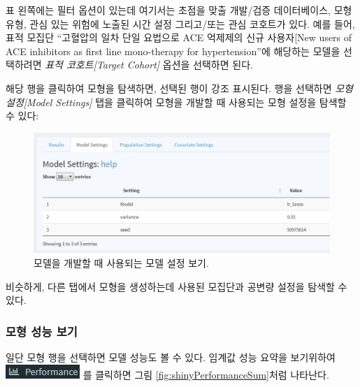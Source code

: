 \documentclass[11pt]{book}
\theoremstyle{definition}
\theoremstyle{definition}
\theoremstyle{definition}
\theoremstyle{remark}
\begin{document}
표 왼쪽에는 필터 옵션이 있는데 여기서는 초점을 맞출 개발/검증
데이터베이스, 모형 유형, 관심 있는 위험에 노출된 시간 설정 그리고/또는
관심 코호트가 있다. 예를 들어, 표적 모집단 ``고혈압의 일차 단일 요법으로
ACE 억제제의 신규 사용자{[}New users of ACE inhibitors as first line
mono-therapy for hypertension''에 해당하는 모델을 선택하려면 \emph{표적
코호트{[}Target Cohort{]}} 옵션을 선택하면 된다.

해당 행을 클릭하여 모형을 탐색하면, 선택된 행이 강조 표시된다. 행을
선택하면 \emph{모형 설정{[}Model Settings{]}} 탭을 클릭하여 모형을
개발할 때 사용되는 모형 설정을 탐색할 수 있다:

\begin{figure}

{\centering \includegraphics[width=1\linewidth]{images/PatientLevelPrediction/shiny/shinyModel} 

}

\caption{모델을 개발할 때 사용되는 모델 설정 보기.}\label{fig:shinyModel}
\end{figure}

비슷하게, 다른 탭에서 모형을 생성하는데 사용된 모집단과 공변량 설정을
탐색할 수 있다.

\subsubsection*{모형 성능 보기}\label{--}

일단 모형 행을 선택하면 모델 성능도 볼 수 있다. 임계값 성능 요약을
보기위하여
\includegraphics{images/PatientLevelPrediction/performance.png} 를
클릭하면 그림 \ref{fig:shinyPerformanceSum}처럼 나타난다.
\end{document}
